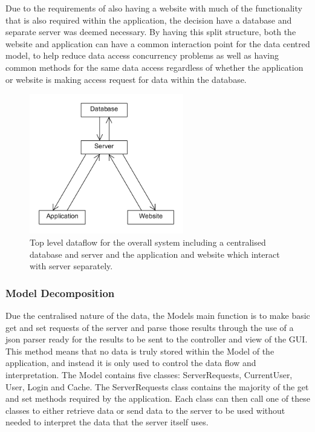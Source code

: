 Due to the requirements of also having a website with much of the functionality that is also required within the application, the decision have a database and separate server was deemed necessary. By having this split structure, both the website and application can have a common interaction point for the data centred model, to help reduce data access concurrency problems as well as having common methods for the same data access regardless of whether the application or website is making access request for data within the database.

\begin{figure}[h!]
    \centering
    \includegraphics[width=0.6\textwidth]{imdfig2}
    \caption{Top level dataflow for the overall system including a centralised database and server and the application and website which interact with server separately.}
\end{figure}

\newpage
\subsubsection{Model Decomposition}
Due the centralised nature of the data, the Models main function is to make basic get and set requests of the server and parse those results through the use of a json parser ready for the results to be sent to the controller and view of the GUI. This method means that no data is truly stored within the Model of the application, and instead it is only used to control the data flow and interpretation. The Model contains five classes: ServerRequests, CurrentUser, User, Login and Cache. The ServerRequests class contains the majority of the get and set methods required by the application. Each class can then call one of these classes to either retrieve data or send data to the server to be used without needed to interpret the data that the server itself uses.

